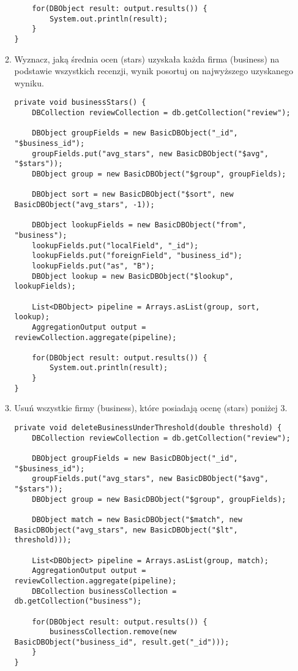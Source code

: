 \documentclass[a4paper,9pt]{extarticle}	%
\begin{document}
\begin{enumerate}
\begin{enumerate}
\begin{lstlisting}
	for(DBObject result: output.results()) {
		System.out.println(result);
	}
}
	  \end{lstlisting}
	  
	  \item Wyznacz, jaką średnia ocen (stars) uzyskała każda firma (business) na podstawie wszystkich recenzji, wynik posortuj on najwyższego uzyskanego wyniku.
	  \begin{lstlisting}
private void businessStars() {
	DBCollection reviewCollection = db.getCollection("review");

	DBObject groupFields = new BasicDBObject("_id", "$business_id");
	groupFields.put("avg_stars", new BasicDBObject("$avg", "$stars"));
	DBObject group = new BasicDBObject("$group", groupFields);

	DBObject sort = new BasicDBObject("$sort", new BasicDBObject("avg_stars", -1));

	DBObject lookupFields = new BasicDBObject("from", "business");
	lookupFields.put("localField", "_id");
	lookupFields.put("foreignField", "business_id");
	lookupFields.put("as", "B");
	DBObject lookup = new BasicDBObject("$lookup", lookupFields);

	List<DBObject> pipeline = Arrays.asList(group, sort, lookup);
	AggregationOutput output = reviewCollection.aggregate(pipeline);

	for(DBObject result: output.results()) {
		System.out.println(result);
	}
}
	  \end{lstlisting}
	  
	  \item Usuń wszystkie firmy (business), które posiadają ocenę (stars) poniżej 3.
	  \begin{lstlisting}
private void deleteBusinessUnderThreshold(double threshold) {
	DBCollection reviewCollection = db.getCollection("review");

	DBObject groupFields = new BasicDBObject("_id", "$business_id");
	groupFields.put("avg_stars", new BasicDBObject("$avg", "$stars"));
	DBObject group = new BasicDBObject("$group", groupFields);

	DBObject match = new BasicDBObject("$match", new BasicDBObject("avg_stars", new BasicDBObject("$lt", threshold)));

	List<DBObject> pipeline = Arrays.asList(group, match);
	AggregationOutput output = reviewCollection.aggregate(pipeline);
	DBCollection businessCollection = db.getCollection("business");

	for(DBObject result: output.results()) {
		businessCollection.remove(new BasicDBObject("business_id", result.get("_id")));
	}
}
	  \end{lstlisting}
	\end{enumerate}
	

\end{enumerate}
\end{document}
